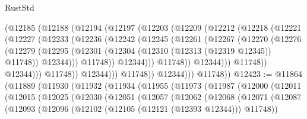 \begin{lexlean}{RustStd}
\begin{coremodule}
{\begin{coremodule}
{{{{{{{{{{{{{{{{{{{{{{{{{{{{{                      (@12185
                        (@12188
                          (@12194
                            (@12197
                              (@12203
                                (@12209
                                  (@12212
                                    (@12218
                                      (@12221
                                        (@12227
                                          (@12233
                                            (@12236
                                              (@12242
                                                (@12245
                                                  (@12261
                                                    (@12267
                                                      (@12270
                                                        (@12276
                                                          (@12279
                                                            (@12295
                                                              (@12301
                                                                (@12304
                                                                  (@12310
                                                                    (@12313 (@12319 @12345))
                                                                    @11748))
                                                                @12344)))
                                                          @11748))
                                                      @12344)))
                                                @11748))
                                            @12344)))
                                      @11748))
                                  @12344)))
                            @11748))
                        @12344)))
                  @11748))
              @12344)))
        @11748))
@12423 := @11864
    (@11889
      (@11930
        (@11932
          (@11934
            (@11955
              (@11973
                (@11987
                  (@12000
                    (@12011
                      (@12015
                        (@12025
                          (@12030
                            (@12051
                              (@12057
                                (@12062
                                  (@12068
                                    (@12071
                                      (@12087
                                        (@12093
                                          (@12096 (@12102 (@12105 (@12121 (@12393 @12344))) @11748))
}}}}}}}}}}}}}}}}}}}}}}}}}}}}}
\end{coremodule}}
\end{coremodule}
\end{lexlean}
